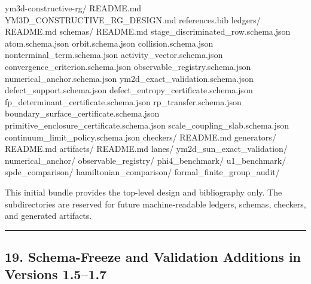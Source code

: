 \documentclass[
]{article}
\newenvironment{Shaded}{}{}
\newcommand{\NormalTok}[1]{#1}
\begin{document}
\begin{Shaded}
\begin{Highlighting}[]
\NormalTok{ym3d{-}constructive{-}rg/}
\NormalTok{  README.md}
\NormalTok{  YM3D\_CONSTRUCTIVE\_RG\_DESIGN.md}
\NormalTok{  references.bib}
\NormalTok{  ledgers/}
\NormalTok{    README.md}
\NormalTok{  schemas/}
\NormalTok{    README.md}
\NormalTok{    stage\_discriminated\_row.schema.json}
\NormalTok{    atom.schema.json}
\NormalTok{    orbit.schema.json}
\NormalTok{    collision.schema.json}
\NormalTok{    nonterminal\_term.schema.json}
\NormalTok{    activity\_vector.schema.json}
\NormalTok{    convergence\_criterion.schema.json}
\NormalTok{    observable\_registry.schema.json}
\NormalTok{    numerical\_anchor.schema.json}
\NormalTok{    ym2d\_exact\_validation.schema.json}
\NormalTok{    defect\_support.schema.json}
\NormalTok{    defect\_entropy\_certificate.schema.json}
\NormalTok{    fp\_determinant\_certificate.schema.json}
\NormalTok{    rp\_transfer.schema.json}
\NormalTok{    boundary\_surface\_certificate.schema.json}
\NormalTok{    primitive\_enclosure\_certificate.schema.json}
\NormalTok{    scale\_coupling\_slab.schema.json}
\NormalTok{    continuum\_limit\_policy.schema.json}
\NormalTok{  checkers/}
\NormalTok{    README.md}
\NormalTok{  generators/}
\NormalTok{    README.md}
\NormalTok{  artifacts/}
\NormalTok{    README.md}
\NormalTok{  lanes/}
\NormalTok{    ym2d\_sun\_exact\_validation/}
\NormalTok{    numerical\_anchor/}
\NormalTok{    observable\_registry/}
\NormalTok{    phi4\_benchmark/}
\NormalTok{    u1\_benchmark/}
\NormalTok{    spde\_comparison/}
\NormalTok{    hamiltonian\_comparison/}
\NormalTok{    formal\_finite\_group\_audit/}
\end{Highlighting}
\end{Shaded}

This initial bundle provides the top-level design and bibliography only.
The subdirectories are reserved for future machine-readable ledgers,
schemas, checkers, and generated artifacts.

\begin{center}\rule{0.5\linewidth}{0.5pt}\end{center}

\subsection{19. Schema-Freeze and Validation Additions in Versions
1.5--1.7}\label{schema-freeze-and-validation-additions-in-versions-1.51.7}
\end{document}
